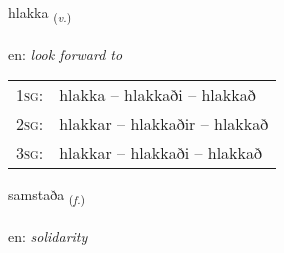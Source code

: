 \documentclass[frontgrid, backgrid]{flacards}\usepackage[]{graphicx}\usepackage[]{xcolor}
\begin{document}
\renewcommand{\flhead}{\vskip5pt \fboxsep=0pt {\small\bfseries\footnotesize Sagnorð | Verb}}
\renewcommand{\fcfoot}{\vskip5pt \fboxsep=0pt \hspace{2pt}{\small\bfseries\footnotesize 3K}}

\renewcommand{\blhead}{\vskip5pt {\small\bfseries\footnotesize Sagnorð | Verb }}
\renewcommand{\bcfoot}{\vskip5pt \hspace{2pt}{\small\bfseries\footnotesize 3K}}


{hlakka \small{\textsubscript{(\textit{v.})}} \\[1ex] %
\textphonetic{[l̥ahka]} \\
en: \emph{look forward to} \\  [2ex]
\renewcommand*{\arraystretch}{0.8}
\begin{tabular}{p{1cm}l}
\textsc{1sg}: & hlakka -- hlakkaði -- hlakkað \\ 
\textsc{2sg}: & hlakkar -- hlakkaðir -- hlakkað \\ 
\textsc{3sg}: & hlakkar -- hlakkaði -- hlakkað \\ 
\end{tabular}
}

\renewcommand{\flhead}{\vskip5pt \fboxsep=0pt {\small\bfseries\footnotesize Nafnorð | Noun}}
\renewcommand{\fcfoot}{\vskip5pt \fboxsep=0pt \hspace{2pt}{\small\bfseries\footnotesize 3K}}

\renewcommand{\blhead}{\vskip5pt {\small\bfseries\footnotesize Nafnorð | Noun }}
\renewcommand{\bcfoot}{\vskip5pt \hspace{2pt}{\small\bfseries\footnotesize 3K}}


{samstaða \small{\textsubscript{(\textit{f.})}} \\[1ex] %
\textphonetic{[samstaða]} \\
en: \emph{solidarity} \\  [2ex]
\renewcommand*{\arraystretch}{0.8}
}
\end{document}
